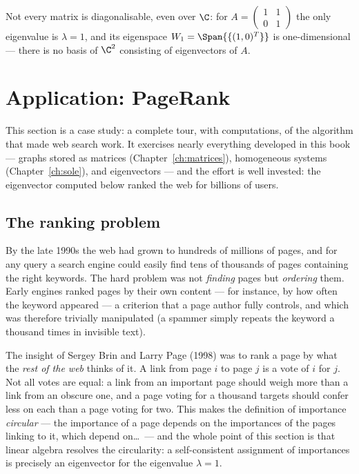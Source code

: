\begin{warning}
Not every matrix is diagonalisable, even over $\C$: for
$A = \left( \begin{smallmatrix} 1 & 1\\ 0 & 1 \end{smallmatrix} \right)$ the only eigenvalue is
$\lambda = 1$, and its eigenspace $W_1 = \Span{\{(1,0)^T\}}$ is one-dimensional — there is no basis of
$\C^2$ consisting of eigenvectors of $A$.
\end{warning}

\section{Application: PageRank}\label{sec:pagerank}

This section is a case study: a complete tour, with computations, of the algorithm that made web search
work. It exercises nearly everything developed in this book — graphs stored as matrices
(Chapter~\ref{ch:matrices}), homogeneous systems (Chapter~\ref{ch:sole}), and eigenvectors — and the
effort is well invested: the eigenvector computed below ranked the web for billions of users.

\subsection{The ranking problem}

By the late 1990s the web had grown to hundreds of millions of pages, and for any query a search engine
could easily find tens of thousands of pages containing the right keywords. The hard problem was not
\emph{finding} pages but \emph{ordering} them. Early engines ranked pages by their own content — for
instance, by how often the keyword appeared — a criterion that a page author fully controls, and which
was therefore trivially manipulated (a spammer simply repeats the keyword a thousand times in invisible
text).

The insight of Sergey Brin and Larry Page (1998) was to rank a page by what the \emph{rest of the web}
thinks of it. A link from page $i$ to page $j$ is a vote of $i$ for $j$. Not all votes are equal: a link
from an important page should weigh more than a link from an obscure one, and a page voting for a
thousand targets should confer less on each than a page voting for two. This makes the definition of
importance \emph{circular} — the importance of a page depends on the importances of the pages linking to
it, which depend on\ldots\ — and the whole point of this section is that linear algebra resolves the
circularity: a self-consistent assignment of importances is precisely an eigenvector for the eigenvalue
$\lambda = 1$.

